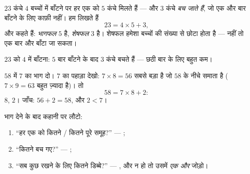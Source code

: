 \begin{definition}[शेषफल]\label{def:g3:division:remainder}
$23$ कंचे $4$ बच्चों में बाँटने पर हर एक को $5$ कंचे मिलते हैं ---
और $3$ कंचे \emph{बच जाते हैं}, जो एक और बार बाँटने के लिए
काफ़ी नहीं। हम लिखते हैं
\[
23 = 4 \times 5 + 3 ,
\]
और कहते हैं: \emph{भागफल} $5$ है,
\emph{शेषफल} $3$ है। शेषफल हमेशा बच्चों की
संख्या से छोटा होता है --- नहीं तो एक बार और बाँटा जा
सकता।
\end{definition}

\begin{omfigure}

{\small $23$ को $4$ में बाँटना: $5$ बार बाँटने के बाद $3$ कंचे
बचते हैं --- छठी बार के लिए बहुत कम।}
\end{omfigure}

\begin{example}\label{ex:g3:division:remainder}
$58$ में $7$ का भाग दो। $7$ का पहाड़ा देखो:
$7 \times 8 = 56$ सबसे बड़ा  है जो $58$ के नीचे समाता है
($7 \times 9 = 63$ बहुत ज़्यादा है)। तो
\[
58 = 7 \times 8 + 2 :
\]
 $8$,  $2$। जाँच: $56 + 2 = 58$, और $2 < 7$।
\end{example}

\begin{method}\label{met:g3:division:interpret}
भाग देने के बाद कहानी पर लौटो:
\begin{enumerate}
  \item ``हर एक को कितने / कितने पूरे समूह?'' --- ;
  \item ``कितने बच गए?'' --- ;
  \item ``सब कुछ रखने के लिए कितने डिब्बे?'' --- , और
          न हो तो उसमें \emph{एक और} जोड़ो।
\end{enumerate}
\end{method}

